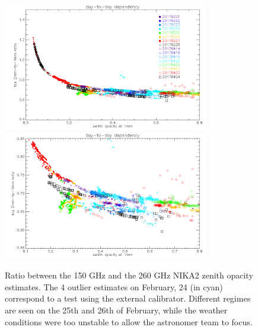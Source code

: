 \begin{figure}[ht]
\begin{center}
  \includegraphics[width=0.8\textwidth]{Figures/opacity_tau1_tau2_ratio_perday_N2R9_N2R10.png}
  \includegraphics[width=0.8\textwidth]{Figures/opacity_tau1_tau2_ratio_perday_zoom_N2R9_N2R10.png}
  \caption[Opacity ratio per days]{Ratio between the 150 GHz and the 260 GHz NIKA2 zenith
    opacity estimates. The 4 outlier estimates on February, 24 (in
    cyan) correspond to a test using the external
    calibrator. Different regimes are seen on the 25th and 26th of
    February, while the weather conditions were too unstable to allow
    the astronomer team to focus.
  }
  \label{fig:opacity_ratio_perday}
\end{center}
\end{figure}


